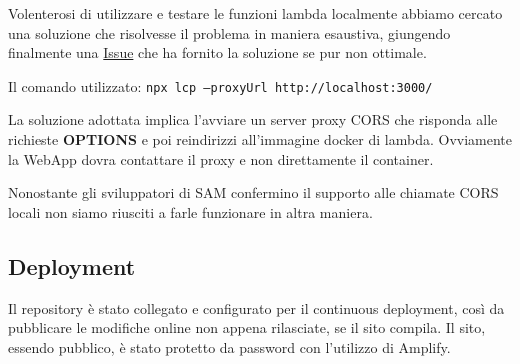         Volenterosi di utilizzare e testare le funzioni lambda localmente abbiamo cercato una soluzione che risolvesse il problema in maniera esaustiva,
        giungendo finalmente una \href{https://github.com/aws/aws-sam-cli/issues/323#issuecomment-483650280}{Issue} che ha fornito la soluzione se pur non ottimale.
        
        Il comando utilizzato: \texttt{npx lcp --proxyUrl http://localhost:3000/}
        
        La soluzione adottata implica  l'avviare un server proxy CORS che risponda alle richieste \textbf{OPTIONS} e poi reindirizzi all'immagine docker di lambda. 
        Ovviamente la WebApp dovra contattare il proxy e non direttamente il container.
        
        Nonostante gli sviluppatori di SAM confermino il supporto alle chiamate CORS locali non siamo riusciti a farle funzionare in altra maniera.
        
\subsection{Deployment} 
        Il repository è stato collegato e configurato per il continuous deployment, così da pubblicare le modifiche online non appena rilasciate, se il sito compila. Il sito, essendo pubblico, è stato protetto da password con l'utilizzo di Amplify.
        
        
